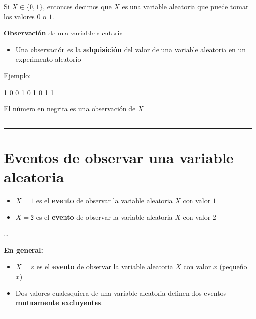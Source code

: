 \documentclass[
]{book}
\providecommand{\tightlist}{%
  \setlength{\itemsep}{0pt}\setlength{\parskip}{0pt}}
\begin{document}
Si \(X \in \{0,1\}\), entonces decimos que \(X\) es una variable aleatoria que puede tomar los valores \(0\) o \(1\).

\textbf{Observación} de una variable aleatoria

\begin{itemize}
\tightlist
\item
  Una observación es la \textbf{adquisición} del valor de una variable aleatoria en un experimento aleatorio
\end{itemize}

Ejemplo:

1 0 0 1 0 \textbf{1} 0 1 1

El número en negrita es una observación de \(X\)

\begin{center}\rule{0.5\linewidth}{0.5pt}\end{center}

\begin{center}\rule{0.5\linewidth}{0.5pt}\end{center}

\hypertarget{eventos-de-observar-una-variable-aleatoria}{%
\section{Eventos de observar una variable aleatoria}\label{eventos-de-observar-una-variable-aleatoria}}

\begin{itemize}
\tightlist
\item
  \(X=1\) es el \textbf{evento} de observar la variable aleatoria \(X\) con valor \(1\)
\item
  \(X=2\) es el \textbf{evento} de observar la variable aleatoria \(X\) con valor \(2\)
\end{itemize}

\ldots{}

\textbf{En general:}

\begin{itemize}
\item
  \(X=x\) es el \textbf{evento} de observar la variable aleatoria \(X\) con valor \(x\) (pequeño \(x\))
\item
  Dos valores cualesquiera de una variable aleatoria definen dos eventos \textbf{mutuamente excluyentes}.
\end{itemize}

\begin{center}\rule{0.5\linewidth}{0.5pt}\end{center}
\end{document}
